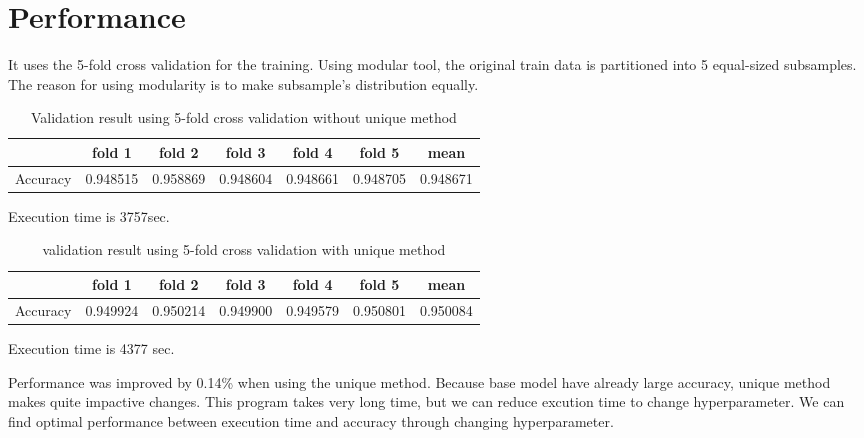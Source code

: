 \documentclass{article}
\begin{document}

\section{Performance}
It uses the 5-fold cross validation for the training. Using modular tool, the original train data is partitioned into 5 equal-sized subsamples. The reason for using modularity is to make subsample's distribution equally.\par
\begin{table} [ht]
\begin{center}
\caption{Validation result using 5-fold cross validation without unique method}
\begin{tabular} {c |c| c|c| c| c|c}
  \textbf{ } & \textbf{fold 1} & \textbf{fold 2}& \textbf{fold 3} & \textbf{fold 4}& \textbf{fold 5} & \textbf{mean}\\
\hline
Accuracy & 0.948515 & 0.958869 & 0.948604 & 0.948661 & 0.948705 & 0.948671\\
\end{tabular}
\end{center}
\end{table}
Execution time is 3757sec.\par
\begin{table} [ht]
\begin{center}
\caption{validation result using 5-fold cross validation with unique method}
\begin{tabular} {c |c| c|c| c| c|c}
  \textbf{ } & \textbf{fold 1} & \textbf{fold 2}& \textbf{fold 3} & \textbf{fold 4}& \textbf{fold 5} & \textbf{mean}\\
\hline
Accuracy & 0.949924 & 0.950214 & 0.949900 & 0.949579 & 0.950801 & 0.950084\\
\end{tabular}
\end{center}
\end{table}
Execution time is 4377 sec.\par
Performance was improved by 0.14\% when using the unique method. Because base model have already large accuracy, unique method makes quite impactive changes. This program takes very long time, but we can reduce excution time to change hyperparameter. We can find optimal performance between execution time and accuracy through changing hyperparameter. \par
\end{document}
